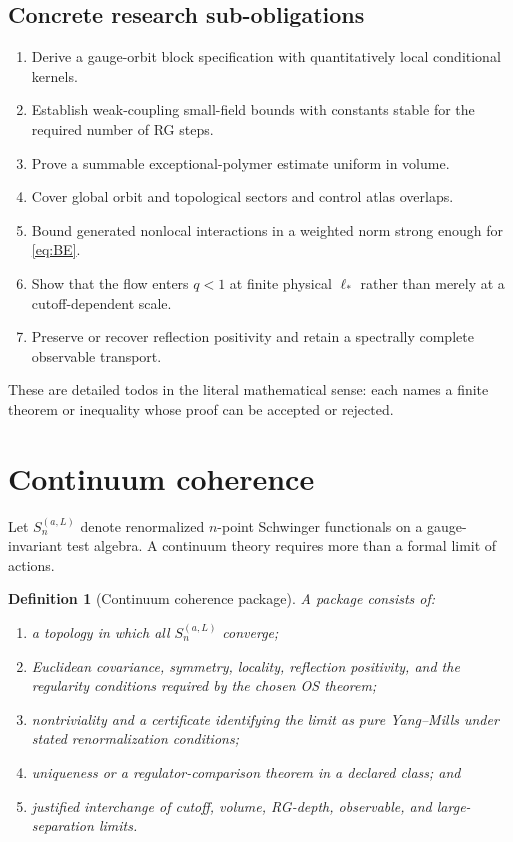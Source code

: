 \documentclass[11pt]{article}
\newtheorem{definition}{Definition}[section]
\theoremstyle{remark}
\begin{document}
\subsection{Concrete research sub-obligations}

\begin{enumerate}[label=\textbf{BE\arabic*.},leftmargin=3em]
\item Derive a gauge-orbit block specification with quantitatively local
      conditional kernels.
\item Establish weak-coupling small-field bounds with constants stable for the
      required number of RG steps.
\item Prove a summable exceptional-polymer estimate uniform in volume.
\item Cover global orbit and topological sectors and control atlas overlaps.
\item Bound generated nonlocal interactions in a weighted norm strong enough
      for \eqref{eq:BE}.
\item Show that the flow enters $q<1$ at finite physical $\ell_*$ rather than
      merely at a cutoff-dependent scale.
\item Preserve or recover reflection positivity and retain a spectrally
      complete observable transport.
\end{enumerate}

These are detailed todos in the literal mathematical sense: each names a
finite theorem or inequality whose proof can be accepted or rejected.

\section{Continuum coherence}

Let $S_n^{(a,L)}$ denote renormalized $n$-point Schwinger functionals on a
gauge-invariant test algebra.  A continuum theory requires more than a formal
limit of actions.

\begin{definition}[Continuum coherence package]
A package consists of:
\begin{enumerate}[label=(\roman*)]
\item a topology in which all $S_n^{(a,L)}$ converge;
\item Euclidean covariance, symmetry, locality, reflection positivity, and
      the regularity conditions required by the chosen OS theorem;
\item nontriviality and a certificate identifying the limit as pure
      Yang--Mills under stated renormalization conditions;
\item uniqueness or a regulator-comparison theorem in a declared class; and
\item justified interchange of cutoff, volume, RG-depth, observable, and
      large-separation limits.
\end{enumerate}
\end{definition}
\end{document}
